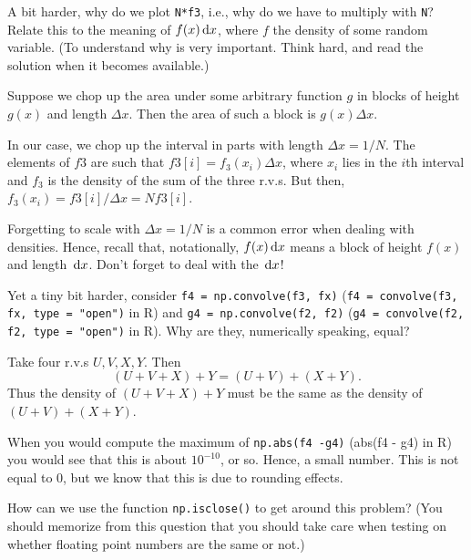 \begin{exercise}
A bit harder, why do we plot \texttt{N*f3}, i.e., why do we have to multiply with \texttt{N}? Relate this to the meaning of $f(x)\,\textrm{d}x$, where $f$ the density of some random variable.
(To understand why is very important. Think hard, and read the solution when it becomes available.)
\begin{solution}
  Suppose we chop up the area under some arbitrary  function $g$ in blocks of height $g(x)$ and length $\Delta x$.
  Then the area of such a block is $g(x) \Delta x$.


  In our case, we chop up the interval in parts with length $\Delta x = 1/N$.
  The elements of $f3$ are such that $f3[i] = f_{3}(x_{i}) \Delta x$, where $x_{i}$ lies in the $i$th interval and $f_{3}$ is the density of the sum of the three r.v.s. But then, $f_{3}(x_{i}) = f3[i]/\Delta x = N f3[i]$.

  Forgetting to scale with $\Delta x = 1/N$ is a common error when dealing with densities.
  Hence, recall that, notationally, $f(x) \,\textrm{d}x$ means a block of height $f(x)$ and length $\,\textrm{d}x$. Don't forget to deal with the $\,\textrm{d}x$!
\end{solution}
\end{exercise}

\begin{exercise}
Yet a tiny bit harder, consider \texttt{f4 = np.convolve(f3, fx)} (\texttt{f4 = convolve(f3, fx, type = "open")} in R) and \texttt{g4 = np.convolve(f2, f2)} (\texttt{g4 = convolve(f2, f2, type = "open")} in R). Why are they, numerically speaking,  equal?
\begin{solution}
Take four r.v.s $U, V, X, Y$. Then
  \begin{equation}
    \label{eq:15}
(U+V+X) + Y = (U+V) + (X+Y).
  \end{equation}
Thus the density of $(U+V+X) + Y$ must be the same as the density of $(U+V) + (X+Y)$.
\end{solution}
\end{exercise}


\begin{exercise}
When you would compute the maximum of \texttt{np.abs(f4 -g4)} (abs(f4 - g4) in R) you would see that this is about $10^{-10}$, or so.
Hence, a small number.
This is not equal to 0, but we know that this is due to rounding effects.

How can we use the function \texttt{np.isclose()} to get around this problem?
(You should memorize from this question that you should take care when testing on whether floating point numbers are the same or not.)
\end{exercise}
